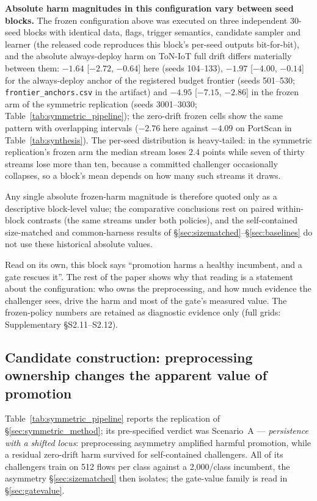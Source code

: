 \documentclass[a4paper,fleqn]{cas-sc}
\begin{document}
\textbf{Absolute harm magnitudes in this configuration vary between seed blocks.} The frozen configuration above was executed on three independent 30-seed blocks with identical data, flags, trigger semantics, candidate sampler and learner (the released code reproduces this block's per-seed outputs bit-for-bit), and the absolute always-deploy harm on ToN-IoT full drift differs materially between them: $-1.64$ [$-2.72$, $-0.64$] here (seeds 104--133), $-1.97$ [$-4.00$, $-0.14$] for the always-deploy anchor of the registered budget frontier (seeds 501--530; \texttt{frontier\_anchors.csv} in the artifact) and $-4.95$ [$-7.15$, $-2.86$] in the frozen arm of the symmetric replication (seeds 3001--3030; Table~\ref{tab:symmetric_pipeline}); the zero-drift frozen cells show the same pattern with overlapping intervals ($-2.76$ here against $-4.09$ on PortScan in Table~\ref{tab:synthesis}). The per-seed distribution is heavy-tailed: in the symmetric replication's frozen arm the median stream loses $2.4$ points while seven of thirty streams lose more than ten, because a committed challenger occasionally collapses, so a block's mean depends on how many such streams it draws.

Any single absolute frozen-harm magnitude is therefore quoted only as a descriptive block-level value; the comparative conclusions rest on paired within-block contrasts (the same streams under both policies), and the self-contained size-matched and common-harness results of \S\ref{sec:sizematched}--\S\ref{sec:baselines} do not use these historical absolute values.

Read on its own, this block says ``promotion harms a healthy incumbent, and a gate rescues it''. The rest of the paper shows why that reading is a statement about the configuration: who owns the preprocessing, and how much evidence the challenger sees, drive the harm and most of the gate's measured value. The frozen-policy numbers are retained as diagnostic evidence only (full grids: Supplementary \S S2.11--S2.12).

\subsection{Candidate construction: preprocessing ownership changes the apparent value of promotion}
\label{sec:symmetric}

Table~\ref{tab:symmetric_pipeline} reports the replication of \S\ref{sec:symmetric_method}; its pre-specified verdict was Scenario~A --- \emph{persistence with a shifted locus}: preprocessing asymmetry amplified harmful promotion, while a residual zero-drift harm survived for self-contained challengers. All of its challengers train on 512 flows per class against a 2{,}000/class incumbent, the asymmetry \S\ref{sec:sizematched} then isolates; the gate-value family is read in \S\ref{sec:gatevalue}.
\end{document}
